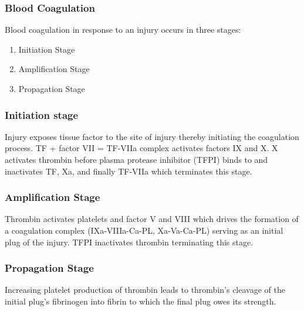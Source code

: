 \begin{frame}
  \frametitle{Blood Coagulation}
  Blood coagulation in response to an injury occurs in three stages:\begin{enumerate}
  \item Initiation Stage\\
  \item Amplification Stage\\
  \item Propagation Stage
  \end{enumerate} \end{frame}
  \begin{frame}\frametitle{Initiation stage}
 \hspace{1.57em}Injury exposes tissue factor to the site of injury thereby initiating the coagulation process. TF + factor VII = TF-VIIa complex activates factors IX and X. X activates thrombin before plasma protease inhibitor (TFPI) binds to and inactivates TF, Xa, and finally TF-VIIa which terminates this stage.
 \end{frame}
 \begin{frame}\frametitle{Amplification Stage}
 \hspace{1.57em}Thrombin activates platelets and factor V and VIII which drives the formation of a coagulation complex (IXa-VIIIa-Ca-PL, Xa-Va-Ca-PL) serving as an initial plug of the injury. TFPI inactivates thrombin terminating this stage.
 \end{frame}\begin{frame}\frametitle{Propagation Stage}
 \hspace{1.57em}Increasing platelet production of thrombin leads to thrombin's cleavage of the initial plug's fibrinogen into fibrin to which the final plug owes its strength.
\end{frame}



